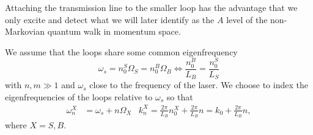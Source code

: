 \documentclass[fontsize=11pt,paper=a4,open=any,
twoside=no,toc=listof,toc=bibliography,headings=optiontohead,
captions=nooneline,captions=tableabove,english,DIV=12,numbers=noenddot,final,parskip=false,
headinclude=true,footinclude=false,BCOR=0mm]{scrartcl}
\begin{document}
Attaching the transmission line to the smaller loop has the advantage
that we only excite and detect what we will later identify as the
\(A\) level of the non-Markovian quantum walk in momentum space.

We assume that the loops share some common eigenfrequency
\begin{equation}
  \label{eq:46}
  ω_{s} = n_{0}^{S}Ω_{S} = n_{0}^{B}Ω_{B}\iff \frac{n_{0}^{B}}{L_{B}}
  = \frac{n_{0}^{S}}{L_{S}}
\end{equation}
with \(n,m\gg 1\) and \(ω_{s}\) close to the frequency of the
laser. We choose to index the eigenfrequencies of the loops relative
to \(ω_{s}\) so that
\begin{equation}
  \label{eq:49}
  \begin{aligned}
    ω_{n}^{X} &= ω_{s} + n Ω_{X} & k_{n}^{X} = \frac{2π}{L_{B}}
                                   n_{0}^{X} + \frac{2π}{L_{B}} n = k_{0} + \frac{2π}{L_{B}} n,
  \end{aligned}
\end{equation}
where \(X=S,B\).
\end{document}
